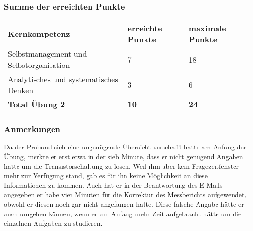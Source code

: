 \subsubsection{Summe der erreichten Punkte}

\begin{center}
  \begin{tabular}{ | p{7cm} | p{3cm} | p{3cm} |}
   \hline
   \textbf{Kernkompetenz} & \textbf{erreichte Punkte} & \textbf{maximale Punkte} \\ \hline
   Selbstmanagement und Selbstorganisation & 7 & 18\\ \hline
   Analytisches und systematisches Denken & 3 & 6\\ \hline
   \textbf{Total Übung 2} & \textbf{10} & \textbf{24}\\ \hline
  \end{tabular}
\end{center}

\subsubsection{Anmerkungen}
Da der Proband sich eine ungenügende Übersicht verschafft hatte am Anfang der Übung, merkte er erst etwa in der sieb Minute, dass er nicht genügend Angaben hatte um die Transistorschaltung zu lösen. Weil ihm aber kein Fragezeitfenster mehr zur Verfügung stand, gab es für ihn keine Möglichkeit an diese Informationen zu kommen. Auch hat er in der Beantwortung des E-Mails angegeben er habe vier Minuten für die Korrektur des Messberichts aufgewendet, obwohl er diesen noch gar nicht angefangen hatte. Diese falsche Angabe hätte er auch umgehen können, wenn er am Anfang mehr Zeit aufgebracht hätte um die einzelnen Aufgaben zu studieren.